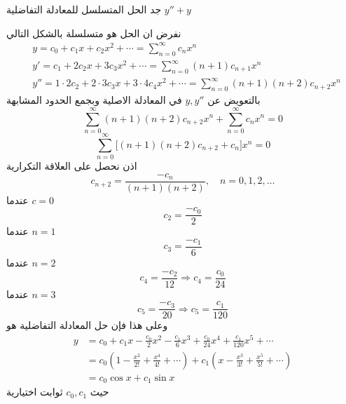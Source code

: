 \begin{example}
	جد الحل المتسلسل للمعادلة التفاضلية $y'' + y$
\end{example}
\begin{solution}
	نفرض ان الحل هو متسلسلة بالشكل التالي
	\begin{align*}
		& y = c_0 + c_1 x + c_2 x^2 + \cdots = \sum_{n=0}^{\infty} c_n x^n \\[10pt]
	    & y' = c_1 + 2c_2x + 3c_3 x^2 + \cdots = \sum_{n=0}^{\infty} (n+1)c_{n+1} x^n \\[10pt]
	    & y'' = 1\cdot2 c_2 + 2\cdot3 c_3x + 3\cdot4 c_4 x^2 + \cdots = \sum_{n=0}^{\infty} (n+1)(n+2)c_{n+2}x^n 
	\end{align*}
	بالتعويض عن $y, y''$ في المعادلة الاصلية وبجمع الحدود المشابهة
	\[
	\sum_{n=0}^{\infty} (n+1)(n+2)c_{n+2}x^n  + \sum_{n=0}^{\infty} c_n x^n =0
	\]
	\[
	\sum_{n=0}^{\infty} \big[(n+1)(n+2)c_{n+2} + c_n\big]x^n  = 0
	\]
	اذن نحصل على العلاقة التكرارية
	\[
	c_{n+2} = \frac{-c_n}{(n+1)(n+2)}, \quad n=0,1,2,\dots
	\]
	عندما $c=0$ 
	\[
	c_2 = \frac{-c_0}{2}
	\]
	عندما $n=1$ 
	\[
	c_3 = \frac{-c_1}{6}
	\]
	عندما $n=2$ 
	\[
	c_4 = \frac{-c_2}{12} \Rightarrow c_4 = \frac{c_0}{24}
	\]
	عندما $n=3$ 
	\[
	c_5 = \frac{-c_3}{20} \Rightarrow c_5 = \frac{c_1}{120}
	\]
	وعلى هذا فإن حل المعادلة التفاضلية هو
\begin{align*}
	y &= c_0 + c_1 x - \frac{c_0}{2} x^2 - \frac{c_1}{6} x^3 + \frac{c_0}{24}x^4 + \frac{c_1}{120} x^5 + \cdots\\[7pt]
	 &= c_0 \left(1-\frac{x^2}{2!} + \frac{x^4}{4!}+\cdots\right) + c_1 \left(x - \frac{x^3}{3!} + \frac{x^5}{5!} + \cdots\right)\\
	&= c_0 \cos x + c_1 \sin x
\end{align*}	
حيث $c_0,c_1 $ ثوابت اختيارية
\end{solution}

